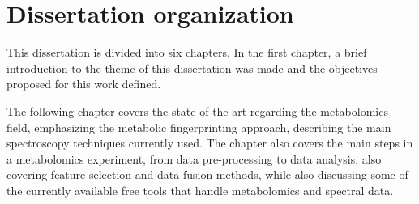 %
%
%	
%	
%



\section{Dissertation organization}

This dissertation is divided into six chapters. In the first chapter, a brief introduction to the theme of this dissertation was made and the objectives proposed for this work defined. 

The following chapter covers the state of the art regarding the metabolomics field, emphasizing the metabolic fingerprinting approach, describing the main spectroscopy techniques currently used. The chapter also covers the main steps in a metabolomics experiment, from data pre-processing to data analysis, also covering feature selection and data fusion methods, while also discussing some of the currently available free tools that handle metabolomics and spectral data.

